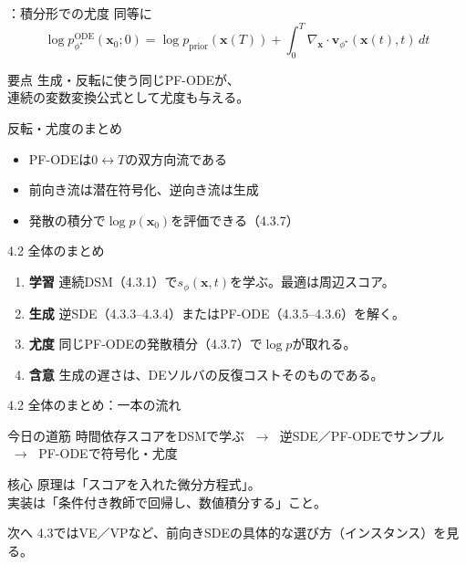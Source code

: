 \assuppl
\begin{frame}{\supplmark：積分形での尤度}
    同等に
    \[
        \log p_{\phi^\star}^{\mathrm{ODE}}(\bm{x}_0;0)
        =
        \log p_{\mathrm{prior}}(\bm{x}(T))
        +
        \int_0^T
        \nabla_{\bm{x}}\cdot\bm{v}_{\phi^\star}(\bm{x}(t),t)\,
        dt
    \]
    \begin{exampleblock}{要点}
        生成・反転に使う同じPF-ODEが、\\
        連続の変数変換公式として尤度も与える。
    \end{exampleblock}
\end{frame}
\asmain
\begin{frame}{反転・尤度のまとめ}
    \begin{itemize}
        \item PF-ODEは$0\leftrightarrow T$の双方向流である
        \item 前向き流は潜在符号化、逆向き流は生成
        \item 発散の積分で$\log p(\bm{x}_0)$を評価できる（4.3.7）
    \end{itemize}
\end{frame}
\asmain
\begin{frame}{4.2 全体のまとめ}
    \begin{enumerate}
        \item \textbf{学習}
        連続DSM（4.3.1）で$s_\phi(\bm{x},t)$を学ぶ。最適は周辺スコア。
        \item \textbf{生成}
        逆SDE（4.3.3–4.3.4）またはPF-ODE（4.3.5–4.3.6）を解く。
        \item \textbf{尤度}
        同じPF-ODEの発散積分（4.3.7）で$\log p$が取れる。
        \item \textbf{含意}
        生成の遅さは、DEソルバの反復コストそのものである。
    \end{enumerate}
\end{frame}
\asmain
\begin{frame}{4.2 全体のまとめ：一本の流れ}
    \begin{block}{今日の道筋}
        時間依存スコアをDSMで学ぶ
        $\;\to\;$
        逆SDE／PF-ODEでサンプル
        $\;\to\;$
        PF-ODEで符号化・尤度
    \end{block}
    \begin{block}{核心}
        原理は「スコアを入れた微分方程式」。\\
        実装は「条件付き教師で回帰し、数値積分する」こと。
    \end{block}
    \begin{block}{次へ}
        4.3ではVE／VPなど、前向きSDEの具体的な選び方（インスタンス）を見る。
    \end{block}
\end{frame}
